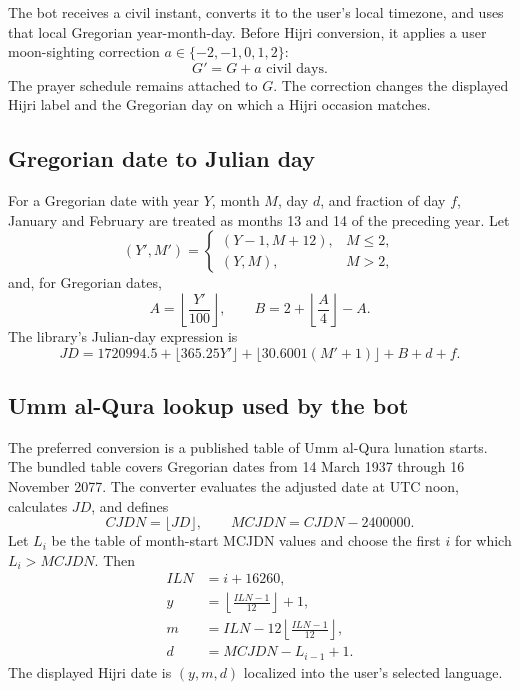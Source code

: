 \documentclass[11pt,a4paper]{article}
\begin{document}
The bot receives a civil instant, converts it to the user's local timezone, and uses that local Gregorian year-month-day. Before Hijri conversion, it applies a user moon-sighting correction $a\in\{-2,-1,0,1,2\}$:
\begin{equation}
  G'=G+a\text{ civil days}.
\end{equation}
The prayer schedule remains attached to $G$. The correction changes the displayed Hijri label and the Gregorian day on which a Hijri occasion matches.

\subsection{Gregorian date to Julian day}

For a Gregorian date with year $Y$, month $M$, day $d$, and fraction of day $f$, January and February are treated as months 13 and 14 of the preceding year. Let
\[
(Y',M')=\begin{cases}(Y-1,M+12),&M\leq2,\\(Y,M),&M>2,\end{cases}
\]
and, for Gregorian dates,
\[
 A=\left\lfloor\frac{Y'}{100}\right\rfloor,\qquad B=2+\left\lfloor\frac{A}{4}\right\rfloor-A.
\]
The library's Julian-day expression is
\begin{equation}
 JD=1720994.5+\lfloor365.25Y'\rfloor+
 \lfloor30.6001(M'+1)\rfloor+B+d+f.
 \label{eq:jd}
\end{equation}

\subsection{Umm al-Qura lookup used by the bot}

The preferred conversion is a published table of Umm al-Qura lunation starts. The bundled table covers Gregorian dates from 14 March 1937 through 16 November 2077. The converter evaluates the adjusted date at UTC noon, calculates $JD$, and defines
\begin{equation}
  CJDN=\lfloor JD\rfloor,\qquad MCJDN=CJDN-2400000.
\end{equation}
Let $L_i$ be the table of month-start MCJDN values and choose the first $i$ for which $L_i>MCJDN$. Then
\begin{align}
  ILN &= i+16260,\\
  y &= \left\lfloor\frac{ILN-1}{12}\right\rfloor+1,\\
  m &= ILN-12\left\lfloor\frac{ILN-1}{12}\right\rfloor,\\
  d &= MCJDN-L_{i-1}+1.
\end{align}
The displayed Hijri date is $(y,m,d)$ localized into the user's selected language.
\end{document}
